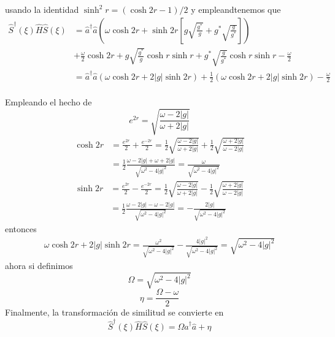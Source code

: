 usando la identidad $\sinh^{2}r = (\cosh{2r}-1)/2$ y empleandtenemos que
\begin{align*}
  \hat{S}^{\dagger}(\xi) \hat{H} \hat{S}(\xi) & = \hat{a}^{\dagger}\hat{a} \left( \omega \cosh{2r} + \sinh{2r} \left[ g \sqrt{\frac{g^{*}}{g}} + g^{*} \sqrt{\frac{g}{g^{*}}} \right] \right)                              \\
                                              & + \frac{\omega}{2} \cosh{2r} + g \sqrt{\frac{g^{*}}{g}} \cosh{r}\sinh{r} + g^{*}\sqrt{\frac{g}{g^{*}}}\cosh{r}\sinh{r}-\frac{\omega}{2}                                    \\
                                              & = \hat{a}^{\dagger}\hat{a} \left( \omega \cosh{2r} + 2\vert g\vert \sinh{2r} \right) + \frac{1}{2}\left(\omega\cosh{2r} + 2\vert g \vert \sinh{2r}\right)-\frac{\omega}{2} \\
\end{align*}

Empleando el hecho de
\begin{equation*}
  e^{2r} = \sqrt{\frac{\omega-2\vert g\vert}{\omega+2\vert g\vert}}
\end{equation*}
\begin{align*}
  \cosh{2r} & = \frac{e^{2r}}{2} + \frac{e^{-2r}}{2} = \frac{1}{2} \sqrt{\frac{\omega-2\vert g\vert}{\omega+2\vert g\vert}} + \frac{1}{2} \sqrt{\frac{\omega+2\vert g\vert}{\omega-2\vert g\vert}} \\
            & = \frac{1}{2} \frac{\omega-2\vert g\vert + \omega + 2\vert g\vert}{\sqrt{\omega^{2}-4\vert g\vert^{2}}} = \frac{\omega}{\sqrt{\omega^{2}-4\vert g\vert^{2}}}
\end{align*}
\begin{align*}
  \sinh{2r} & = \frac{e^{2r}}{2} - \frac{e^{-2r}}{2} = \frac{1}{2} \sqrt{\frac{\omega-2\vert g\vert}{\omega+2\vert g\vert}} - \frac{1}{2} \sqrt{\frac{\omega+2\vert g\vert}{\omega-2\vert g\vert}} \\
            & = \frac{1}{2} \frac{\omega-2\vert g\vert - \omega - 2\vert g\vert}{\sqrt{\omega^{2}-4\vert g\vert^{2}}} = - \frac{2\vert g\vert}{\sqrt{\omega^{2}-4\vert g\vert^{2}}}
\end{align*}
entonces
\begin{align*}
  \omega \cosh{2r} + 2\vert g\vert \sinh{2r} = \frac{\omega^{2}}{\sqrt{\omega^{2}-4\vert g\vert^{2}}} - \frac{4\vert g\vert^{2}}{\sqrt{\omega^{2}-4\vert g\vert^{2}}} = \sqrt{\omega^{2}-4\vert g\vert^{2}}
\end{align*}
ahora si definimos
\begin{equation*}
  \Omega = \sqrt{\omega^{2}-4\vert g\vert^{2}}
\end{equation*}
\begin{equation*}
  \eta = \frac{\Omega - \omega}{2}
\end{equation*}
Finalmente, la transformación de similitud se convierte en
\begin{equation*}
  \hat{S}^{\dagger}(\xi) \hat{H} \hat{S}(\xi) = \Omega \hat{a}^{\dagger}\hat{a} + \eta
\end{equation*}
